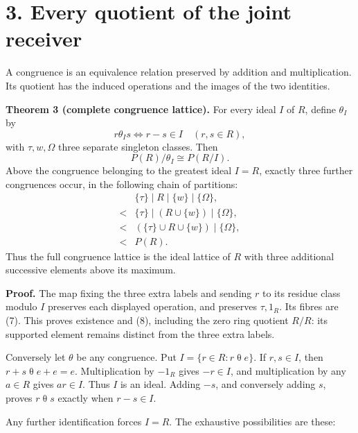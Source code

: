 \documentclass[
]{article}
\begin{document}
\section{3. Every quotient of the joint
receiver}\label{every-quotient-of-the-joint-receiver}

A congruence is an equivalence relation preserved by addition and
multiplication. Its quotient has the induced operations and the images
of the two identities.

\textbf{Theorem 3 (complete congruence lattice).} For every ideal \(I\)
of \(R\), define \(\theta_I\) by \[
r\mathrel{\theta_I}s\iff r-s\in I\quad(r,s\in R),
\tag{7}
\] with \(\tau,w,\Omega\) three separate singleton classes. Then \[
P(R)/\theta_I\cong P(R/I).
\tag{8}
\] Above the congruence belonging to the greatest ideal \(I=R\), exactly
three further congruences occur, in the following chain of partitions:
\[
\begin{split}
&\{\tau\}\mid R\mid\{w\}\mid\{\Omega\},\\
<&\{\tau\}\mid(R\cup\{w\})\mid\{\Omega\},\\
<&(\{\tau\}\cup R\cup\{w\})\mid\{\Omega\},\\
<&P(R).
\end{split}
\tag{9}
\] Thus the full congruence lattice is the ideal lattice of \(R\) with
three additional successive elements above its maximum.

\textbf{Proof.} The map fixing the three extra labels and sending \(r\)
to its residue class modulo \(I\) preserves each displayed operation,
and preserves \(\tau,1_R\). Its fibres are (7). This proves existence
and (8), including the zero ring quotient \(R/R\): its supported element
remains distinct from the three extra labels.

Conversely let \(\theta\) be any congruence. Put
\(I=\{r\in R:r\mathrel\theta e\}\). If \(r,s\in I\), then
\(r+s\mathrel\theta e+e=e\). Multiplication by \(-1_R\) gives
\(-r\in I\), and multiplication by any \(a\in R\) gives \(ar\in I\).
Thus \(I\) is an ideal. Adding \(-s\), and conversely adding \(s\),
proves \(r\mathrel\theta s\) exactly when \(r-s\in I\).

Any further identification forces \(I=R\). The exhaustive possibilities
are these:
\end{document}
